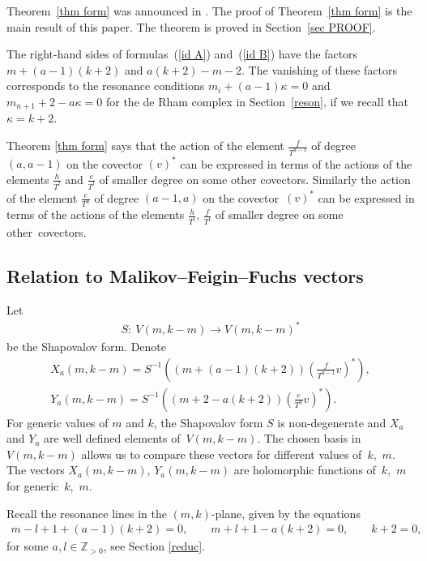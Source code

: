 \documentclass[pdftex]{sigma}
\numberwithin{equation}{section}
\begin{document}
Theorem~\ref{thm form} was announced in \cite{SV2}. The proof of Theorem~\ref{thm form} is the main result of this paper. The theorem is proved in Section~\ref{sec PROOF}.

\begin{rem} The right-hand sides of formulas~(\ref{id A}) and~(\ref{id B}) have the factors $m+(a-1)(k+2)$ and $a(k+2)-m-2$. The vanishing of these factors corresponds to the resonance conditions $m_i+(a-1)\kappa=0$ and $m_{n+1}+2-a\kappa=0$ for the de Rham complex in Section~\ref{reson}, if we recall that $\kappa=k+2$.
\end{rem}

\begin{rem}Theorem \ref{thm form} says that the action of the element $\frac{f}{T^{a-1}}$ of degree $(a,a-1)$ on the covector $(v)^*$ can be expressed in terms of the actions of the elements $\frac{h}{T^{l}}$ and $\frac{e}{T^{l}}$ of smaller degree on some other covectors. Similarly the action of the element $\frac{e}{T^{a}}$ of degree $(a-1,a)$ on the covector~$(v)^*$ can be expressed in terms of the actions of the elements $\frac{h}{T^{l}}$, $\frac{f}{T^{l}}$ of smaller degree on some other~covectors.
\end{rem}

\subsection{Relation to Malikov--Feigin--Fuchs vectors}\label{rel to MFF}
Let
\begin{gather*}
S \colon \ V(m,k-m)\to V(m,k-m)^*
\end{gather*}
be the Shapovalov form.
Denote
\begin{gather*}
X_a(m,k-m) = S^{-1}\left((m+(a-1)(k+2))\left(\frac{f}{T^{a-1}}v\right)^*\right),\\
Y_a(m,k-m) = S^{-1}\left((m+2-a(k+2))\left(\frac{e}{T^a}v\right)^*\right).
\end{gather*}
For generic values of $m$ and $k$, the Shapovalov form $S$ is non-degenerate and $X_a$ and $Y_a$ are well defined elements of~$V(m,k-m)$. The chosen basis in $V(m,k-m)$ allows us to compare these vectors for different values of~$k$,~$m$. The vectors $X_a(m,k-m)$, $Y_a(m,k-m)$ are holomorphic functions of~$k$,~$m$ for generic~$k$,~$m$.

Recall the resonance lines in the $(m,k)$-plane, given by the equations
\begin{gather*}
m-l+1+(a-1)(k+2)=0, \qquad m+l+1-a(k+2)=0, \qquad k+2=0,
\end{gather*}
for some $a, l\in{\mathbb Z}_{>0}$, see Section \ref{reduc}.
\end{document}
